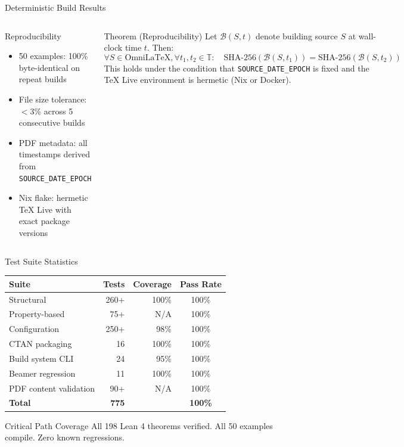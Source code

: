 \documentclass[
  doctype=beamer,
  beameraspectratio=169,
  beamertheme=Copenhagen,
  language=english,
]{omnilatex}
\begin{document}
\begin{frame}{Deterministic Build Results}
  \begin{columns}[T]
    \begin{block}{Reproducibility}
      \begin{itemize}
        \item 50 examples: 100\% byte-identical on repeat builds
        \item File size tolerance: $<3\%$ across 5 consecutive builds
        \item PDF metadata: all timestamps derived from \texttt{SOURCE\_DATE\_EPOCH}
        \item Nix flake: hermetic TeX Live with exact package versions
      \end{itemize}
    \end{block}

    \begin{exampleblock}{Theorem (Reproducibility)}
      Let $\mathcal{B}(S, t)$ denote building source $S$ at wall-clock time $t$. Then:
      \[
        \forall S \in \text{OmniLaTeX}, \forall t_1, t_2 \in \mathbb{T}:
        \quad \text{SHA-256}(\mathcal{B}(S, t_1)) = \text{SHA-256}(\mathcal{B}(S, t_2))
      \]
      This holds under the condition that \texttt{SOURCE\_DATE\_EPOCH} is fixed and the TeX Live environment is hermetic (Nix or Docker).
    \end{exampleblock}
  \end{columns}
\end{frame}

\begin{frame}{Test Suite Statistics}
  \begin{table}
    \centering
    \begin{tabular}{l r r c}
      \hline
      Suite                    & Tests & Coverage & Pass Rate \\
      \hline
      Structural               & 260+  & 100\%    & 100\% \\
      Property-based           & 75+   & N/A      & 100\% \\
      Configuration            & 250+  & 98\%     & 100\% \\
      CTAN packaging           & 16    & 100\%    & 100\% \\
      Build system CLI         & 24    & 95\%     & 100\% \\
      Beamer regression        & 11    & 100\%    & 100\% \\
      PDF content validation   & 90+   & N/A      & 100\% \\
      \hline
      \textbf{Total}           & \textbf{775} & & \textbf{100\%} \\
      \hline
    \end{tabular}
  \end{table}

  \begin{alertblock}{Critical Path Coverage}
    All 198 Lean 4 theorems verified. All 50 examples compile. Zero known regressions.
  \end{alertblock}
\end{frame}
\end{document}
